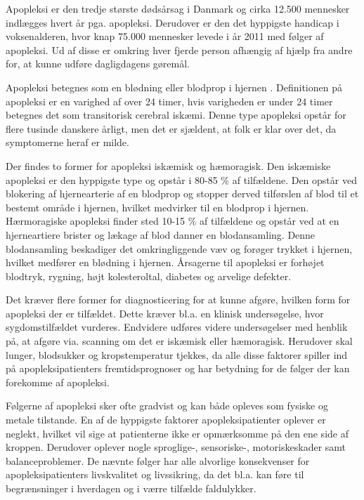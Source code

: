 Apopleksi er den tredje største dødsårsag i Danmark og cirka 12.500 mennesker indlægges hvert år pga. apopleksi. Derudover er den det hyppigste handicap i voksenalderen, hvor knap 75.000 mennesker levede i år 2011 med følger af apopleksi. Ud af disse er omkring hver fjerde person afhængig af hjælp fra andre for, at kunne udføre dagligdagens gøremål. \cite{Hjernesagen2015a}

Apopleksi betegnes som en blødning eller blodprop i hjernen \cite{Hjernesagen2015a}. Definitionen på apopleksi er en varighed af over 24 timer, hvis varigheden er under 24 timer betegnes det som transitorisk cerebral iskæmi\cite{Sundhed.dk2014, Ritter2015}. Denne type apopleksi opstår for flere tusinde danskere årligt, men det er sjældent, at folk er klar over det, da symptomerne heraf er milde\cite{Hjernesagen2015a}.

Der findes to former for apopleksi iskæmisk og hæmoragisk.
Den iskæmiske apopleksi er den hyppigste type og opstår i 80-85 \% af tilfældene\cite{Sundhed.dk2014}. Den opstår ved blokering af hjernearterie af en blodprop og stopper derved tilførslen af blod til et bestemt område i hjernen, hvilket medvirker til en blodprop i hjernen\cite{Hjernesagen2015a}.
Hærmoragiske apopleksi finder sted 10-15 \% af tilfældene og opstår ved at en hjerneartiere brister og lækage af blod danner en blodansamling\cite{Sundhed.dk2014, Schulze2011}. Denne blodansamling beskadiger det omkringliggende væv og forøger trykket i hjernen, hvilket medfører en blødning i hjernen\citep{Caplan2006}. Årsagerne til apopleksi er forhøjet blodtryk, rygning, højt kolesteroltal, diabetes og arvelige defekter\cite{Academic2015}.

Det kræver flere former for diagnosticering for at kunne afgøre, hvilken form for apopleksi der er tilfældet. Dette kræver bl.a. en klinisk undersøgelse, hvor sygdomstilfældet vurderes.\citep{Sundhedsstyrelsen2009} Endvidere udføres videre undersøgelser med henblik på, at afgøre via. scanning om det er iskæmisk eller hæmoragisk. Herudover skal lunger, blodsukker og kropstemperatur tjekkes, da alle disse faktorer spiller ind på apopleksipatienters fremtidsprognoser og har betydning for de følger der kan forekomme af apopleksi.\citep{Sundhedsstyrelsen2009}

Følgerne af apopleksi sker ofte gradvist og kan både opleves som fysiske og metale tilstande\cite{Muus2008}. En af de hyppigste faktorer apopleksipatienter oplever er neglekt, hvilket vil sige at patienterne ikke er opmærksomme på den ene side af kroppen\cite{Sundhed.dk}. Derudover oplever nogle sproglige-, sensoriske-, motoriskeskader samt balanceproblemer\cite{Nichols1997, Muus2008}. De nævnte følger har alle alvorlige konsekvenser for apopleksipatienters livskvalitet og livssikring, da det bl.a. kan føre til  begrænsninger i hverdagen og i værre tilfælde faldulykker. 

